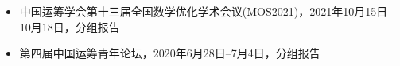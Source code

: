 %
%


{
\fontsize{9.5pt}{\baselineskip}\selectfont

\begin{itemize}[leftmargin=*]
	\item 中国运筹学会第十三届全国数学优化学术会议(MOS2021)，2021年10月15日-- 10月18日，分组报告
	\item 第四届中国运筹青年论坛，2020年6月28日--7月4日，分组报告 %
\end{itemize}
}